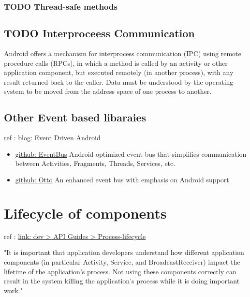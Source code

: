 \subsubsection{{\bfseries\sffamily TODO} Thread-safe methods}
\label{sec:orgheadline3}

\subsection{{\bfseries\sffamily TODO} Interproceess Communication}
\label{sec:orgheadline5}
Android offers a mechanism for interprocess communication (IPC) using remote
procedure calls (RPCs), in which a method is called by an activity or other
application component, but executed remotely (in another process), with any
result returned back to the caller. Data must be understood by the operating
system to be moved from the address space of one process to another.


\subsection{Other Event based libaraies}
\label{sec:orgheadline6}
ref : \href{http://wale.oyediran.me/2015/07/16/event-driven-android/}{blog: Event Driven Android}

\begin{itemize}
\item \href{http://greenrobot.github.io/EventBus/}{github: EventBus} Android optimized event bus that simplifies communication
between Activities, Fragments, Threads, Services, etc.
\item \href{http://square.github.io/otto/}{github: Otto} An enhanced event bus with emphasis on Android support
\end{itemize}


\section{Lifecycle of components}
\label{sec:orgheadline9}

ref : \href{https://developer.android.com/guide/topics/processes/process-lifecycle.html}{link: dev > API Guides > Process-lifecycle}

"It is important that application developers understand how different
application components (in particular Activity, Service, and
BroadcastReceiver) impact the lifetime of the application's process. Not using
these components correctly can result in the system killing the application's
process while it is doing important work."

